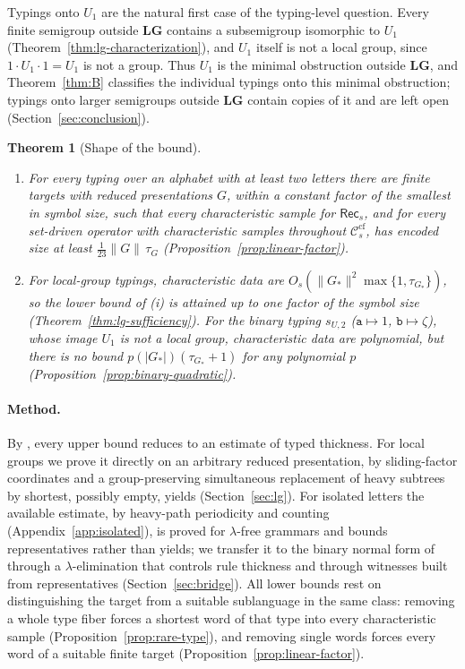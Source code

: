 \documentclass[11pt]{article}
\numberwithin{equation}{section}
\theoremstyle{plain}
\theoremstyle{definition}
\theoremstyle{remark}
\theoremstyle{plain}
\newtheorem{mainthm}{Theorem}
\newcommand{\cf}{\mathrm{cf}}
\newcommand{\Ccf}[1]{\mathcal C_{#1}^{\cf}}
\newcommand{\Rec}{\mathsf{Rec}}
\newcommand{\LG}{\mathbf{LG}}
\begin{document}
Typings onto $U_1$ are the natural first case of the typing-level question.
Every finite semigroup outside $\LG$ contains a subsemigroup isomorphic to
$U_1$ (Theorem~\ref{thm:lg-characterization}), and $U_1$ itself is not a local
group, since $1\cdot U_1\cdot1=U_1$ is not a group.  Thus $U_1$ is the minimal
obstruction outside $\LG$, and Theorem~\ref{thm:B} classifies the individual
typings onto this minimal obstruction; typings onto larger semigroups outside
$\LG$ contain copies of it and are left open
\textup(Section~\ref{sec:conclusion}\textup).

\begin{mainthm}[Shape of the bound]
\label{thm:C}
\begin{enumerate}[label=\textup{(\roman*)},leftmargin=*]
\item For every typing over an alphabet with at least two letters there are
finite targets with reduced presentations $G$, within a constant factor of the
smallest in symbol size, such that every characteristic sample for $\Rec_s$, and
for every set-driven operator with characteristic samples throughout $\Ccf{s}$,
has encoded size at least $\tfrac1{23}\|G\|\,\tau_G$
\textup(Proposition~\ref{prop:linear-factor}\textup).
\item For local-group typings, characteristic data are
$O_s(\|G_*\|^2\max\{1,\tau_{G_*}\})$, so the lower bound of \textup{(i)} is attained
up to one factor of the symbol size \textup(Theorem~\ref{thm:lg-sufficiency}\textup).
For the binary typing $s_{U,2}$ \textup($\mathtt a\mapsto1$, $\mathtt b\mapsto\zeta$\textup),
whose image $U_1$ is not a local group, characteristic data are polynomial,
but there is no bound $p(|G_*|)(\tau_{G_*}+1)$ for any polynomial $p$
\textup(Proposition~\ref{prop:binary-quadratic}\textup).
\end{enumerate}
\end{mainthm}

\paragraph{Method.}
By \cite[Corollary~6.3]{kuriyamaCFG}, every upper bound reduces to an
estimate of typed thickness.
For local groups we prove it directly on an arbitrary reduced presentation,
by sliding-factor coordinates and a group-preserving simultaneous replacement
of heavy subtrees by shortest, possibly empty, yields (Section~\ref{sec:lg}).
For isolated letters the available estimate, by heavy-path periodicity and
counting (Appendix~\ref{app:isolated}), is proved for $\lambda$-free grammars and
bounds representatives rather than yields; we transfer it to the binary
normal form of \cite{kuriyamaCFG} through a $\lambda$-elimination that controls rule thickness
and through witnesses built from representatives (Section~\ref{sec:bridge}).  All lower bounds rest on
distinguishing the target from a suitable sublanguage in the same class: removing
a whole type fiber forces a shortest word of that type into every
characteristic sample (Proposition~\ref{prop:rare-type}), and removing single
words forces every word of a suitable finite target
(Proposition~\ref{prop:linear-factor}).
\end{document}
